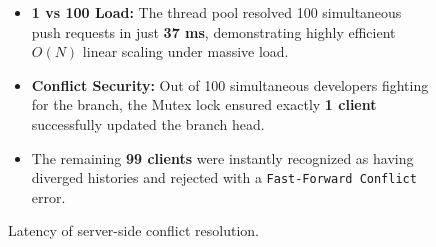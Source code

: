 \documentclass[12pt,a4paper]{article}
\begin{document}
\begin{figure}[h]
    \centering
    \begin{minipage}{0.48\textwidth}
        \centering
        \caption{Latency of server-side conflict resolution.}
    \end{minipage}\hfill
    \begin{minipage}{0.48\textwidth}
        \vspace{1cm} %
        \begin{itemize}
            \item \textbf{1 vs 100 Load:} The thread pool resolved 100 simultaneous push requests in just \textbf{37 ms}, demonstrating highly efficient $O(N)$ linear scaling under massive load.
            \item \textbf{Conflict Security:} Out of 100 simultaneous developers fighting for the branch, the Mutex lock ensured exactly \textbf{1 client} successfully updated the branch head.
            \item The remaining \textbf{99 clients} were instantly recognized as having diverged histories and rejected with a \texttt{Fast-Forward Conflict} error.
        \end{itemize}
    \end{minipage}
\end{figure}
\end{document}
